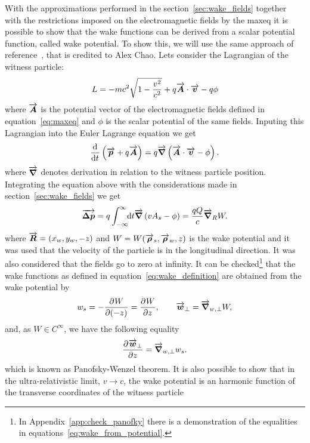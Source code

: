     With the approximations performed in the section~\ref{sec:wake_fields} together with the restrictions imposed on the electromagnetic fields by the \gls{maxeq} it is possible to show that the wake functions can be derived from a scalar potential function, called wake potential. To show this, we will use the same approach of reference~\cite{Stupakov2000a}, that is credited to Alex Chao. Lets consider the Lagrangian of the witness particle:
    \begin{align}
  	  	L = -mc^2\sqrt{1 - \frac{v^2}{c^2}} + q\overrightarrow{\boldsymbol{A}}\cdot\overrightarrow{\boldsymbol{v}} - q\phi
    \end{align}
    where $\overrightarrow{\boldsymbol{A}}$ is the potential vector of the electromagnetic fields defined in equation~\eqref{eq:maxeq} and $\phi$ is the scalar potential of the same fields. Inputing this Lagrangian into the Euler Lagrange equation we get
    \begin{align}
	  	\frac{\mathrm{d}^{{}}}{\mathrm{d} t^{{}}} \left(\overrightarrow{\boldsymbol{p}} + q\overrightarrow{\boldsymbol{A}}\right) = q\overrightarrow{\boldsymbol{\nabla}}\left( \overrightarrow{\boldsymbol{A}}\cdot\overrightarrow{\boldsymbol{v}} - \phi\right).
    \end{align}
    where $\overrightarrow{\boldsymbol{\nabla}}$ denotes derivation in relation to the witness particle position. Integrating the equation above with the considerations made in section~\ref{sec:wake_fields} we get
    \begin{align}
   		\overrightarrow{\boldsymbol{\Delta p}} = q\int_{-\infty}^{\infty}\!\!\text{d}t \overrightarrow{\boldsymbol{\nabla}}\left(vA_s - \phi \right) = \frac{qQ}{c} \overrightarrow{\boldsymbol{\nabla}}_R W.
    \end{align}
    where $\overrightarrow{\boldsymbol{R}} =(x_w, y_w, -z)$ and $W = W(\overrightarrow{\boldsymbol{\rho}}_s, \overrightarrow{\boldsymbol{\rho}}_w, z)$ is the wake potential and it was used that the velocity of the particle is in the longitudinal direction. It was also considered that the fields go to zero at infinity. It can be checked\footnote{In Appendix~\ref{app:check_panofky} there is a demonstration of the equalities in equations~\eqref{eq:wake_from_potential}.} that the wake functions as defined in equation~\eqref{eq:wake_definition} are obtained from the wake potential by
    \begin{align}\label{eq:wake_from_potential}
   		w_s = - \frac{\partial^{{}}W}{\partial (-z)^{{}}} = \frac{\partial^{{}}W}{\partial z^{{}}},\qquad \overrightarrow{\boldsymbol{w}}_\perp = \overrightarrow{\boldsymbol{\nabla}}_{w,\perp} W,
    \end{align}
    and, as $W \in C^{\infty}$, we have the following equality
    \begin{align}\label{eq:panofsky_wenzel_theorem}
   		\frac{\partial^{{}}\overrightarrow{\boldsymbol{w}}_\perp}{\partial z^{{}}} = \overrightarrow{\boldsymbol{\nabla}}_{w,\perp} w_s.
    \end{align}
    which is known as Panofsky-Wenzel theorem. It is also possible to show that in the ultra-relativistic limit, $v \to c$, the wake potential is an harmonic function of the transverse coordinates of the witness particle~\cite{Stupakov2000a}
